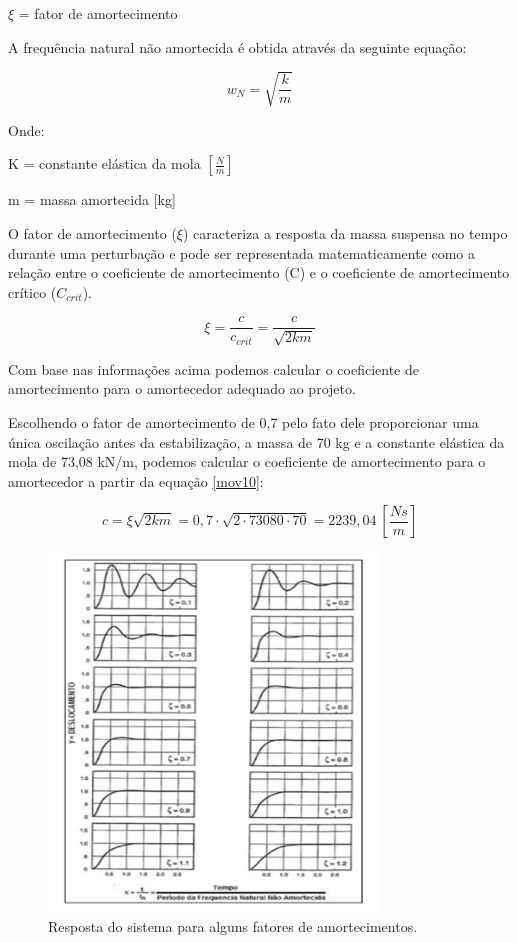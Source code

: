 \noindent $\xi$ = fator de amortecimento

A frequência natural não amortecida é obtida através da seguinte equação:

\begin{equation} \label{mov9}
w_N = \sqrt{\frac{k}{m}}
\end{equation} 

Onde:

\noindent K = constante elástica da mola $\left[\frac{N}{m}\right]\ $

\noindent m = massa amortecida [kg]

O fator de amortecimento ($\xi$) caracteriza a resposta da massa suspensa no tempo durante uma perturbação e pode ser representada matematicamente como a relação entre o coeficiente de amortecimento (C) e o coeficiente de amortecimento crítico ($C_{crit}$).

\begin{equation} \label{mov10}
\xi =\frac{c}{c_{crit}}=\frac{c}{\sqrt{2km}} 
\end{equation} 

Com base nas informações acima podemos calcular o coeficiente de amortecimento para o amortecedor adequado ao projeto.

Escolhendo o fator de amortecimento de 0,7 pelo fato dele proporcionar uma única oscilação antes da estabilização, a massa de 70 kg e a constante elástica da mola de 73,08 kN/m, podemos calcular o coeficiente de amortecimento para o amortecedor a partir da equação \eqref{mov10}:

\[c = \xi \sqrt{2km} = 0,7 \cdot \sqrt{2 \cdot 73080 \cdot 70} = 2239,04 \ \left[ \frac{Ns}{m} \right] \]

\begin{figure}[H]
	\centering
	\includegraphics[width=250pt]{figuras/deslocamento_amortecido.png}
	\caption{Resposta do sistema para alguns fatores de amortecimentos.}
\end{figure}

